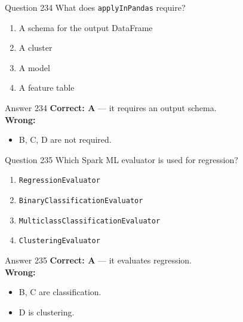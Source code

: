\documentclass[aspectratio=169,11pt]{beamer}
\begin{document}
	\begin{frame}{Question 234}
		What does \texttt{applyInPandas} require?
		\begin{enumerate}[label=\Alph*.]
			\item A schema for the output DataFrame
			\item A cluster
			\item A model
			\item A feature table
		\end{enumerate}
	\end{frame}
	\begin{frame}{Answer 234}
		\textbf{Correct: A} --- it requires an output schema.\\
		\vspace{0.5em}
		\textbf{Wrong:}
		\begin{itemize}
			\item B, C, D are not required.
		\end{itemize}
	\end{frame}
	
	\begin{frame}{Question 235}
		Which Spark ML evaluator is used for regression?
		\begin{enumerate}[label=\Alph*.]
			\item \texttt{RegressionEvaluator}
			\item \texttt{BinaryClassificationEvaluator}
			\item \texttt{MulticlassClassificationEvaluator}
			\item \texttt{ClusteringEvaluator}
		\end{enumerate}
	\end{frame}
	\begin{frame}{Answer 235}
		\textbf{Correct: A} --- it evaluates regression.\\
		\vspace{0.5em}
		\textbf{Wrong:}
		\begin{itemize}
			\item B, C are classification.
			\item D is clustering.
		\end{itemize}
	\end{frame}
	
\end{document}
